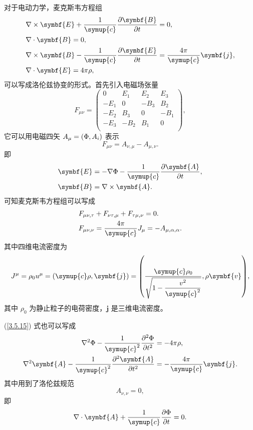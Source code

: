 \documentclass[UTF8, 12pt, a4paper, oneside, onecolumn, fontset=none]{ctexart}
\begin{document}
对于电动力学，麦克斯韦方程组
\begin{align}
&\nabla\times\symbf{E}+\frac{1}{\symup{c}}\frac{\partial\symbf{B}}{\partial{}t}=0,\\
&\nabla\cdot\symbf{B}=0,\\
&\nabla\times\symbf{B}-\frac{1}{\symup{c}}\frac{\partial\symbf{E}}{\partial{}t}=\frac{4\pi}{\symup{c}}\symbf{j},\\
&\nabla\cdot\symbf{E}=4\pi\rho,
\end{align}
可以写成洛伦兹协变的形式。首先引入电磁场张量
\begin{equation}
F_{\mu\nu}=\begin{pmatrix}
0 & E_{1} & E_{2} & E_{3}\\
-E_{1} & 0 & -B_{3} & B_{2}\\
-E_{2} & B_{3} & 0 & -B_{1}\\
-E_{3} & -B_{2} & B_{1} & 0\\
\end{pmatrix},
\end{equation}
它可以用电磁四矢 $A_{\mu}=\mleft(\Phi, A_{i}\mright)$ 表示
\begin{equation}
F_{\mu\nu}=A_{\nu,\mu}-A_{\mu,\nu}.
\end{equation}
即
\begin{align}
\symbf{E}&=-\nabla\Phi-\frac{1}{\symup{c}}\frac{\partial\symbf{A}}{\partial{}t},\\
\symbf{B}&=\nabla\times\symbf{A}.
\end{align}
可知麦克斯韦方程组可以写成
\begin{align}
&F_{\mu\nu,\tau}+F_{\nu\tau,\mu}+F_{\tau\mu,\nu}=0.\\
&F_{\mu\nu,\nu}=\frac{4\pi}{\symup{c}}J_{\mu}=-A_{\mu,\alpha,\alpha}.\label{3.5.15}
\end{align}
其中四维电流密度为
\begin{align}
J^{\mu}=\rho_{0}u^{\mu}=\mleft(\symup{c}\rho,\symbf{j}\mright)=\mleft(\frac{\symup{c}\rho_{0}}{\sqrt{1-\dfrac{v^{2}}{\symup{c}^{2}}}},\rho\symbf{v}\mright),
\end{align}
其中 $\rho_{0}$ 为静止粒子的电荷密度，$\symbf{j}$ 是三维电流密度。

(\ref{3.5.15}) 式也可以写成
\begin{align}
\nabla^{2}\Phi-\frac{1}{\symup{c}^{2}}\frac{\partial{}^{2}\Phi}{\partial{}t^{2}}&=-4\pi\rho,\\
\nabla^{2}\symbf{A}-\frac{1}{\symup{c}^{2}}\frac{\partial{}^{2}\symbf{A}}{\partial{}t^{2}}&=-\frac{4\pi}{\symup{c}}\symbf{j}.
\end{align}
其中用到了洛伦兹规范
\begin{equation}
A_{\nu,\nu}=0,
\end{equation}
即
\begin{equation}
\nabla\cdot\symbf{A}+\frac{1}{\symup{c}}\frac{\partial\Phi}{\partial{}t}=0.
\end{equation}
\end{document}
